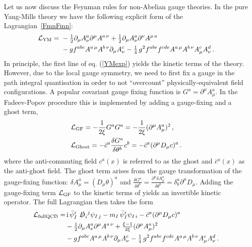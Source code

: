  
Let us now discuss the Feynman rules for non-Abelian gauge theories. In the pure Yang-Mills theory
we have the following explicit form of the Lagrangian~\eqref{FmnFmn}:
%
\begin{align} \label{YMexp} \begin{aligned}
\mathcal{L}_{\rm YM} = \ & 
- {\textstyle\frac{1}{2}} \partial_{\mu} A_{\nu}^{a}  \partial^{\mu} A^{a\, \nu} + {\textstyle\frac{1}{2}} \partial_{\mu} A_{\nu}^{a}  \partial^{\nu} A^{\mu\, a} \\
& -g f^{abc} A^{a\, \mu} A^{b\, \nu} \partial_{\mu}A_{\nu}^{c} -{\textstyle\frac{1}{4}} \, g^{2} f^{abe}f^{cde}A^{a\, \mu}A^{b\, \nu}
A^{c}_{\mu}A^{d}_{\nu} \,.
\end{aligned} \end{align}
%
In principle, the first line of eq. (\ref{YMexp}) yields the kinetic terms of the theory. %
However, due to the local gauge symmetry, we need
to first fix a gauge in the path integral quantisation in order to not ``overcount'' physically-equivalent field configurations.
A popular covariant gauge fixing function is $G^{a}= \partial^{\mu}A^{a}_{\mu}$. In the Fadeev-Popov procedure this is
implemented by adding a gauge-fixing and a ghost term,
%
\begin{align} \label{FadeevPopovYM} \begin{aligned}
& \mathcal{L}_{\rm GF} = - \frac{1}{2\xi} G^{a} G^{a}= -\frac{1}{2\xi} (\partial^{\mu}A_{\mu}^{a})^{2} \,, \\
& \mathcal{L}_{\rm Ghost} = - \bar c^{a} \frac{\delta G^{a}}{\delta \theta^{b}} c^{b}= -\bar c^{a}(\partial^{\mu}D_{\mu}c)^{a} \,.
\end{aligned} \end{align}
%
where the anti-commuting field $c^{a}(x)$ is referred to as the ghost and $\bar c^{a}(x)$ as the
anti-ghost field.
The ghost term arises from the gauge transformation of the gauge-fixing function: $\delta A^{a}_{\mu}= (D_{\mu}\theta)^{a}$
and $\frac{\delta G^{a}}{\delta \theta^{b}}=\frac{\partial^{\mu}\delta A_{\mu}^{a}}{\delta \theta^{b}}=\delta^{a}_{b}\partial^{\mu}D_{\mu}$. Adding the gauge-fixing term 
$\mathcal{L}_{\rm GF}$ to the kinetic terms of  yields an invertible kinetic operator. The full Lagrangian then takes the form
%
\begin{align}
\label{fullQCDLagrangian}
\mathcal{L}_{\rm full QCD } = &\, \mathrm{i}\,\bar\psi_{I}^{i}\, \,\slashed{D}_{i}{}^{j} \psi_{I\, j} 
- m_{I}\,\bar\psi_{I}^{i}\psi_{I\, i} -\bar c^{a}(\partial^{\mu}D_{\mu}c)^{a} \nonumber\\ &
- {\textstyle\frac{1}{2}} \partial_{\mu} A_{\nu}^{a}  \partial^{\mu} A^{a\, \nu} +{\textstyle\frac{\xi-1}{2\xi}} (\partial^{\mu}A_{\mu}^{a})^{2}\\
& -g f^{abc} A^{a\, \mu} A^{b\, \nu} \partial_{\mu}A_{\nu}^{c} -{\textstyle\frac{1}{4}} \, g^{2} f^{abe}f^{cde}A^{a\, \mu}A^{b\, \nu}
A^{c}_{\mu}A^{d}_{\nu} \,.\nonumber
\end{align}

